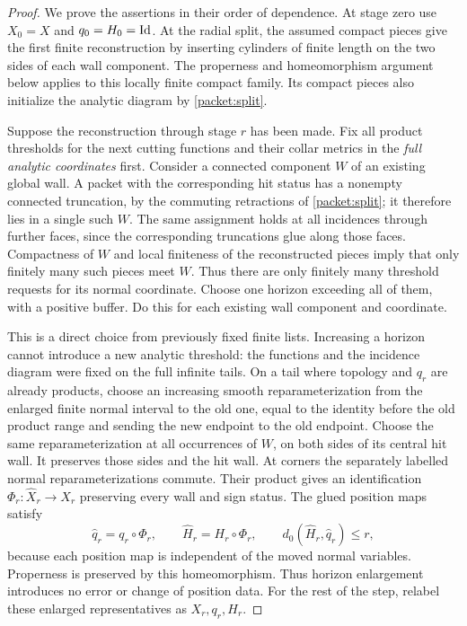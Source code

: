 \begin{proof}
We prove the assertions in their order of dependence.  At stage zero
use $X_0=X$ and $q_0=H_0=\operatorname{Id}$.  At the radial split, the assumed compact
pieces give the first finite reconstruction by inserting cylinders
of finite length on the two sides of each wall component.  The
properness and homeomorphism argument below applies to this locally
finite compact family.  Its compact pieces also initialize the
analytic diagram by \cref{packet:split}.

Suppose the reconstruction through stage $r$ has been made.  Fix all
product thresholds for the next cutting functions and their collar
metrics in the \emph{full analytic coordinates} first.  Consider a
connected component $W$ of an existing global wall.  A packet with
the corresponding hit status has a nonempty connected truncation,
by the commuting retractions of \cref{packet:split}; it therefore lies
in a single such $W$.  The same assignment holds at all incidences
through further faces, since the corresponding truncations glue along
those faces.  Compactness of $W$ and local finiteness of the reconstructed
pieces imply that only finitely many such pieces meet $W$.  Thus there
are only finitely many threshold requests for its normal coordinate.
Choose one horizon exceeding all of them, with a positive buffer.
Do this for each existing wall component and coordinate.

This is a direct choice from previously fixed finite lists.  Increasing
a horizon cannot introduce a new analytic threshold: the functions
and the incidence diagram were fixed on the full infinite tails.
On a tail where topology and $q_r$ are already products, choose an
increasing smooth reparameterization from the enlarged finite normal
interval to the old one, equal to the identity before the old product
range and sending the new endpoint to the old endpoint.  Choose the
same reparameterization at all occurrences of $W$, on both sides of
its central hit wall.  It preserves those sides and the hit wall.
At corners the separately labelled normal reparameterizations commute.
Their product gives an identification
$\Phi_r:\widehat X_r\to X_r$ preserving every wall and sign status.
The glued position maps satisfy
\[
 \widehat q_r=q_r\circ\Phi_r,
 \qquad \widehat H_r=H_r\circ\Phi_r,
 \qquad
 d_0(\widehat H_r,\widehat q_r)\le r,
\]
because each position map is independent of the moved normal
variables.  Properness is preserved by this homeomorphism.  Thus
horizon enlargement introduces no error or change of position data.
For the rest of the step, relabel these enlarged representatives as
$X_r,q_r,H_r$.


\end{proof}
